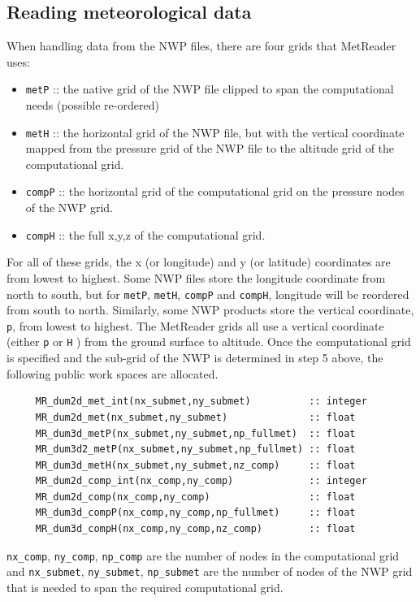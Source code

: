 \documentclass[11pt]{article}   %
\begin{document}
\subsection{Reading meteorological data}
When handling data from the NWP files, there are four grids that MetReader uses:
\begin{itemize}
\item \texttt{metP} :: the native grid of the NWP file clipped to span the
computational needs (possible re-ordered)
\item \texttt{metH} :: the horizontal grid of the NWP file, but with the vertical
coordinate mapped from the pressure grid of the NWP file to the altitude grid of 
the computational grid.
\item \texttt{compP} :: the horizontal grid of the computational grid on the pressure nodes of the NWP grid.
\item \texttt{compH} :: the full x,y,z of the computational grid.
\end{itemize}
For all of these grids, the x (or longitude) and y (or latitude) coordinates are from lowest to
highest. Some NWP files store the longitude coordinate from north to south, but for
\texttt{metP}, \texttt{metH}, \texttt{compP} and \texttt{compH}, longitude will be reordered from
south to north.  Similarly, some NWP products store the vertical coordinate, \texttt{p}, from
lowest to highest.  The MetReader grids all use a vertical coordinate (either \texttt{p}
or \texttt{H} ) from the ground surface to altitude.
Once the computational grid is specified and the sub-grid of the NWP is determined in 
step 5 above, the following public work spaces are allocated.
\begin{verbatim}
     MR_dum2d_met_int(nx_submet,ny_submet)          :: integer
     MR_dum2d_met(nx_submet,ny_submet)              :: float
     MR_dum3d_metP(nx_submet,ny_submet,np_fullmet)  :: float
     MR_dum3d2_metP(nx_submet,ny_submet,np_fullmet) :: float
     MR_dum3d_metH(nx_submet,ny_submet,nz_comp)     :: float
     MR_dum2d_comp_int(nx_comp,ny_comp)             :: integer
     MR_dum2d_comp(nx_comp,ny_comp)                 :: float
     MR_dum3d_compP(nx_comp,ny_comp,np_fullmet)     :: float
     MR_dum3d_compH(nx_comp,ny_comp,nz_comp)        :: float
\end{verbatim}
\texttt{nx\_comp}, \texttt{ny\_comp}, \texttt{np\_comp} are the number
of nodes in the computational grid and 
\texttt{nx\_submet}, \texttt{ny\_submet}, \texttt{np\_submet} are the
number of nodes of the NWP grid that is needed
to span the required computational grid.
\end{document}
